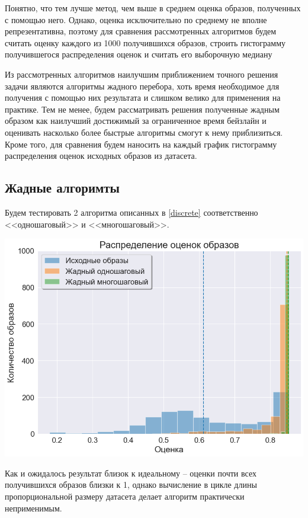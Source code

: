 \documentclass[a4paper,14pt]{extarticle}
\begin{document}
					Понятно, что тем лучше метод, чем выше в среднем оценка образов, полученных с помощью него. Однако, оценка исключительно по среднему не вполне репрезентативна, поэтому для сравнения рассмотренных алгоритмов будем считать оценку каждого из 1000 получившихся образов, строить гистограмму получившегося распределения оценок и считать его выборочную медиану
					
					Из рассмотренных алгоритмов наилучшим приближением точного решения задачи являются алгоритмы жадного перебора, хоть время необходимое для получения с помощью них результата и слишком велико для применения на практике. Тем не менее, будем рассматривать решения полученные жадным образом как наилучший достижимый за ограниченное время бейзлайн и оценивать насколько более быстрые алгоритмы смогут к нему приблизиться. Кроме того, для сравнения будем наносить на каждый график гистограмму распределения оценок исходных образов из датасета. 
					
			\subsection{Жадные алгоримты}
				Будем тестировать 2 алгоритма описанных в \ref{discrete} соответственно <<одношаговый>> и <<многошаговый>>.
				\begin{center}
					\includegraphics[scale = 0.6]{../figures/greedy_at_least_5_subset1000.png}
				\end{center}
				Как и ожидалось результат близок к идеальному -- оценки почти всех получившихся образов близки к 1, однако вычисление в цикле длины пропорциональной размеру датасета делает алгоритм практически неприменимым. 
				
\end{document}
